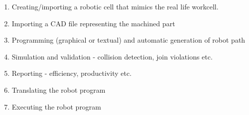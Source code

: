 \begin{enumerate}
  \item Creating/importing a robotic cell that mimics the real life workcell. 
  \item Importing a CAD file representing the machined part
  \item Programming (graphical or textual) and automatic generation of robot path
  \item Simulation and validation - collision detection, join violations etc.
  \item Reporting - efficiency, productivity etc.
  \item Translating the robot program
  \item Executing the robot program
\end{enumerate}
